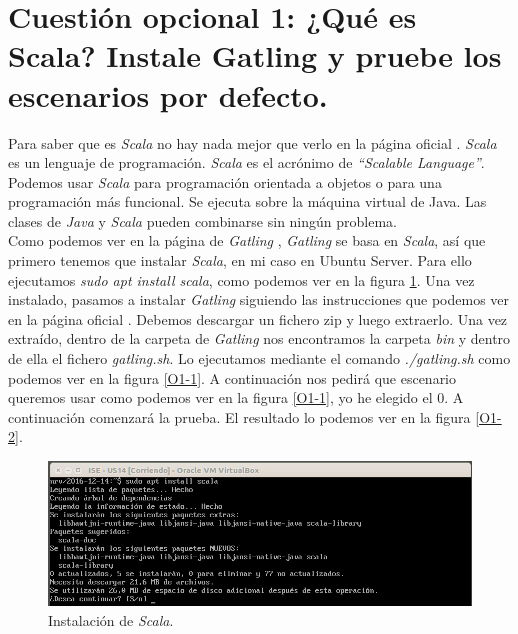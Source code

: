 \documentclass[a4paper,titlepage,12pt]{scrartcl}	%
\numberwithin{figure}{section} %
\numberwithin{table}{section} %
\begin{document}
	\section[Cuestión opcional 1: ¿Qué es Scala? Instale Gatling y pruebe los escenarios por defecto.]{Cuestión opcional 1: ¿Qué es Scala? Instale Gatling y pruebe los escenarios por defecto.}
	
	Para saber que es \textit{Scala} no hay nada mejor que verlo en la página oficial \cite{scala}. \textit{Scala} es un lenguaje de programación. \textit{Scala} es el acrónimo de \textit{``Scalable Language''}. Podemos usar \textit{Scala} para programación orientada a objetos o para una programación más funcional. Se ejecuta sobre la máquina virtual de Java. Las clases de \textit{Java} y \textit{Scala} pueden combinarse sin ningún problema. \\
	
	Como podemos ver en la página de \textit{Gatling} \cite{gatling}, \textit{Gatling} se basa en \textit{Scala}, así que primero tenemos que instalar \textit{Scala}, en mi caso en Ubuntu Server. Para ello ejecutamos \textit{sudo apt install scala}, como podemos ver en la figura \ref{O1-instalacion}. Una vez instalado, pasamos a instalar \textit{Gatling} siguiendo las instrucciones que podemos ver en la página oficial \cite{gatling_download}. Debemos descargar un fichero zip y luego extraerlo. Una vez extraído, dentro de la carpeta de \textit{Gatling} nos encontramos la carpeta \textit{bin} y dentro de ella el fichero \textit{gatling.sh}. Lo ejecutamos mediante el comando \textit{./gatling.sh} como podemos ver en la figura \ref{O1-1}. A continuación nos pedirá que escenario queremos usar como podemos ver en la figura \ref{O1-1}, yo he elegido el 0. A continuación comenzará la prueba. El resultado lo podemos ver en la figura \ref{O1-2}.
	
	\begin{figure}[H]
		\includegraphics[width=\linewidth]{./Imagenes/O1-instalacion.png}
		\vspace{-0.5cm}
		\caption[Instalación de \textit{Scala}.]{Instalación de \textit{Scala}.}
		\label{O1-instalacion}
	\end{figure}
	
\end{document}
